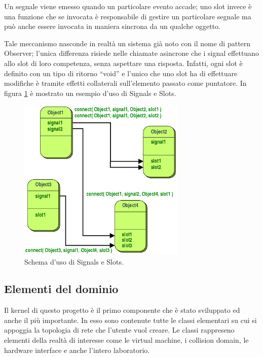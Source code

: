Un segnale viene emesso quando un particolare evento accade; uno slot invece è una funzione che se invocata è responsabile di gestire un particolare segnale ma può anche essere invocata in maniera sincrona da un qualche oggetto.

Tale meccanismo nasconde in realtà un sistema già noto con il nome di pattern Observer; l'unica differenza risiede nelle chiamate asincrone che i signal effettuano allo slot di loro competenza, senza aspettare una risposta. Infatti, ogni slot è definito con un tipo di ritorno ``void'' e l'unico che uno slot ha di effettuare modifiche è tramite effetti collaterali sull'elemento passato come puntatore. In figura \ref{figura:qt_signals_slots} è mostrato un esempio d'uso di Signals e Slots.

\begin{figure}[!htb]
	\centering
	\includegraphics[width=8cm]{images/signals_slots.png}
	\caption{Schema d'uso di Signals e Slots.}
	\label{figura:qt_signals_slots}
\end{figure}

\subsection{Elementi del dominio}
Il kernel di questo progetto è il primo componente che è stato sviluppato ed anche il più importante. In esso sono contenute tutte le classi elementari su cui si appoggia la topologia di rete che l'utente vuol creare. Le classi rappreseno elementi della realtà di interesse come le virtual machine, i collision domain, le hardware interface e anche l'intero laboratorio.

